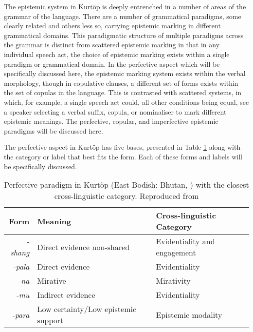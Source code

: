 The epistemic system in Kurtöp is deeply entrenched in a number of areas of the grammar of the language. There are a number of grammatical paradigms, some clearly related and others less so, carrying epistemic marking in different grammatical domains. This paradigmatic structure of multiple paradigms across the grammar is distinct from scattered epistemic marking in that in any individual speech act, the choice of epistemic marking exists within a single paradigm or grammatical domain. In the perfective aspect which will be specifically discussed here, the epistemic marking system exists within the verbal morphology, though in copulative clauses, a different set of forms exists within the set of copulas in the language. This is contrasted with scattered systems, in which, for example, a single speech act could, all other conditions being equal, see a speaker selecting a verbal suffix, copula, or nominaliser to mark different epistemic meanings. The perfective, copular, and imperfective epistemic paradigms will be discussed here.

The perfective aspect in Kurtöp has five bases, presented in Table \ref{t:Discussion:KurtopPerfective} along with the category or label that best fits the form. Each of these forms and labels will be specifically discussed.

\begin{table}
    \caption{Perfective paradigm in Kurtöp (East Bodish: Bhutan, ) with the closest cross-linguistic category. Reproduced from }
    \label{t:Discussion:KurtopPerfective}
    \begin{tabular}{r l l}

        Form            & Meaning                             & Cross-linguistic Category    \\
        \hline
        \textit{-shang} & Direct evidence non-shared          & Evidentiality and engagement \\
        \textit{-pala}  & Direct evidence                     & Evidentiality                \\
        \textit{-na}    & Mirative                            & Mirativity                   \\
        \textit{-mu}    & Indirect evidence                   & Evidentiality                \\
        \textit{-para}  & Low certainty/Low epistemic support & Epistemic modality           \\
        \hline
    \end{tabular}
\end{table}

